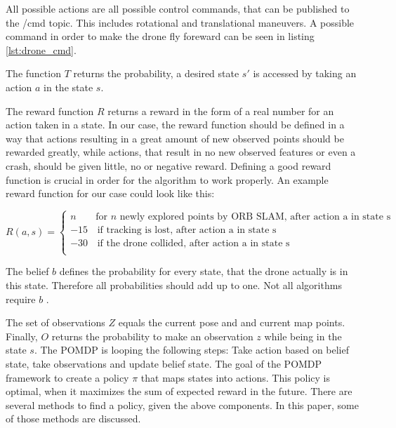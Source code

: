 	All possible actions are all possible control commands, that can be published to the /cmd topic. This includes rotational and translational maneuvers. A possible 
	command in order to make the drone fly foreward can be seen in listing \ref{lst:drone_cmd}. 
	
	The function $T$ returns the probability, a desired state $s'$ is accessed by taking an action $a$ in the state $s$. 
	
	The reward function $R$ returns a reward in the form of a real number for an action taken in a state. In our case, the reward function should be defined in a way that actions resulting 
	in a great amount of new observed points should be rewarded greatly, while actions, that result in no new observed features or even a crash, should be given little, no or negative reward. 
	Defining a good reward function is crucial in order for the algorithm to work properly. An example reward function for our case could look like this: 
	
	$$R(a,s) = \left\{
\begin{array}{ll}
n & \textrm{for } n \textrm{ newly explored points by ORB SLAM,\ after action a in state s} \\
-15 & \, \textrm{if tracking is lost, after action a in state s}  \\
-30 & \, \textrm{if the drone collided, after action a in state s}  \\
\end{array}
\right. $$
	
	The belief $b$ defines the probability for every state, that the drone actually is in this state. Therefore all probabilities should add up to one. Not all algorithms 
	require $b$ \cite{belief}.
	
	The set of observations $Z$ equals the current pose and and current map points. Finally, $O$ returns the probability to make an observation $z$ while being in the state $s$.
	The POMDP is looping the following steps: Take action based on belief state, take observations and update belief state. The goal of the POMDP framework to 
	create a policy $\pi$ that maps states into actions. This policy is optimal, when it maximizes the sum of expected reward in the future. There are several 
	methods to find a policy, given the above components. In this paper, some of those methods are discussed. 
	


